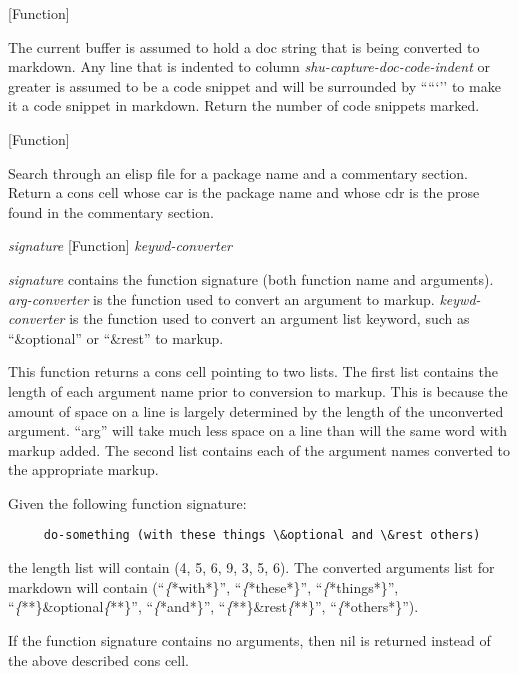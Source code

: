 \vspace{1em}
\noindent
{}
\usebox{\funcname}
 \hfill [Function]

\begin{doc-string}
The current buffer is assumed to hold a doc string that is being converted to
markdown.  Any line that is indented to column \emph{shu-capture-doc-code-indent} or
greater is assumed to be a code snippet and will be surrounded by `````'' to make
it a code snippet in markdown.  Return the number of code snippets marked.
\end{doc-string}

\vspace{1em}
\noindent
{}
\usebox{\funcname}
 \hfill [Function]

\begin{doc-string}
Search through an elisp file for a package name and a commentary section.
Return a cons cell whose car is the package name and whose cdr is the prose
found in the commentary section.
\end{doc-string}

\vspace{1em}
\noindent
{}
\usebox{\funcname}\emph{signature}
 \hfill [Function]
\hspace*{\wd\funcname}\emph{keywd-converter}

\begin{doc-string}
\emph{signature} contains the function signature (both function name and arguments).
\emph{arg-converter} is the function used to convert an argument to markup.  \emph{keywd-converter}
is the function used to convert an argument list keyword, such as ``\&optional'' or ``\&rest''
to markup.

This function returns a cons cell pointing to two lists.  The first list contains the length
of each argument name prior to conversion to markup.  This is because the amount of space
on a line is largely determined by the length of the unconverted argument.  ``arg'' will
take much less space on a line than will the same word with markup added.  The second list
contains each of the argument names converted to the appropriate markup.

Given the following function signature:

\begin{verbatim}
     do-something (with these things \&optional and \&rest others)
\end{verbatim}

the length list will contain (4, 5, 6, 9, 3, 5, 6).  The converted arguments list for
markdown will contain (``\emph\{*with*\}'', ``\emph\{*these*\}'', ``\emph\{*things*\}'', ``\emph\{**\}\&optional\emph\{**\}'', ``\emph\{*and*\}'',
``\emph\{**\}\&rest\emph\{**\}'', ``\emph\{*others*\}'').

If the function signature contains no arguments, then nil is returned instead of the
above described cons cell.
\end{doc-string}

